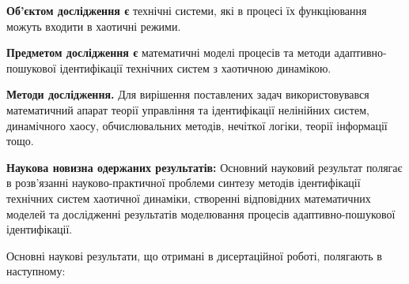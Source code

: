 \documentclass[a4paper,12pt]{atuaref}
\begin{document}
\textbf{Об'єктом дослідження є}
технічні системи, які в процесі їх функціювання можуть
входити в хаотичні режими.

\smallskip
\textbf{Предметом дослідження є}
математичні моделі процесів та методи
адаптивно-пошукової ідентифікації технічних систем з хаотичною динамікою.

\smallskip
\textbf{Методи дослідження.}
Для вирішення поставлених задач використовувався математичний апарат
теорії управління та ідентифікації нелінійних систем, динамічного хаосу,
обчислювальних методів, нечіткої логіки, теорії інформації тощо.

\smallskip
\textbf{Наукова новизна одержаних результатів:}
Основний науковий результат полягає в розв'язанні науково-практичної проблеми
синтезу методів ідентифікації
технічних систем хаотичної динаміки, створенні відповідних математичних
моделей та дослідженні результатів моделювання процесів
адаптивно-пошукової ідентифікації.

Основні наукові результати, що отримані в дисертаційної роботі, полягають
в наступному:
\end{document}
